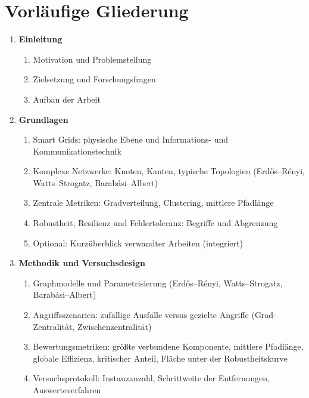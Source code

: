 \documentclass[12pt]{article} %
\begin{document}
\section{Vorläufige Gliederung}

\begin{enumerate}[label=\arabic*., leftmargin=*, itemsep=2pt]

  \item \textbf{Einleitung}
    \begin{enumerate}[label*=\arabic*., itemsep=1pt]
      \item Motivation und Problemstellung
      \item Zielsetzung und Forschungsfragen
      \item Aufbau der Arbeit
    \end{enumerate}

  \item \textbf{Grundlagen}
    \begin{enumerate}[label*=\arabic*., itemsep=1pt]
      \item Smart Grids: physische Ebene und Informations- und Kommunikationstechnik
      \item Komplexe Netzwerke: Knoten, Kanten, typische Topologien (Erdős–Rényi, Watts–Strogatz, Barabási–Albert)
      \item Zentrale Metriken: Gradverteilung, Clustering, mittlere Pfadlänge
      \item Robustheit, Resilienz und Fehlertoleranz: Begriffe und Abgrenzung
      \item Optional: Kurzüberblick verwandter Arbeiten (integriert)
    \end{enumerate}

  \item \textbf{Methodik und Versuchsdesign}
    \begin{enumerate}[label*=\arabic*., itemsep=1pt]
      \item Graphmodelle und Parametrisierung (Erdős–Rényi, Watts–Strogatz, Barabási–Albert)
      \item Angriffsszenarien: zufällige Ausfälle versus gezielte Angriffe (Grad-Zentralität, Zwischenzentralität)
      \item Bewertungsmetriken: größte verbundene Komponente, mittlere Pfadlänge, globale Effizienz, kritischer Anteil, Fläche unter der Robustheitskurve
      \item Versuchsprotokoll: Instanzanzahl, Schrittweite der Entfernungen, Auswerteverfahren
    \end{enumerate}


\end{enumerate}
\end{document}
